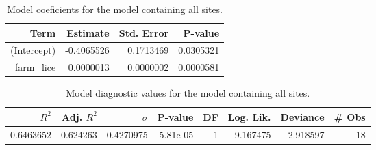 \begin{table}
\centering
\caption{Model coeficients for the model containing all sites.}
\centering
\begin{tabular}[t]{r|r|r|r}
\hline
Term & Estimate & Std. Error & P-value\\
\hline
(Intercept) & -0.4065526 & 0.1713469 & 0.0305321\\
\hline
farm\_lice & 0.0000013 & 0.0000002 & 0.0000581\\
\hline
\end{tabular}
\end{table}

\begin{table}
\centering
\caption{Model diagnostic values for the model containing all sites.}
\centering
\begin{tabular}[t]{r|r|r|r|r|r|r|r}
\hline
$R^2$ & Adj. $R^2$ & $\sigma$ & P-value & DF & Log. Lik. & Deviance & # Obs\\
\hline
0.6463652 & 0.624263 & 0.4270975 & 5.81e-05 & 1 & -9.167475 & 2.918597 & 18\\
\hline
\end{tabular}
\end{table}
